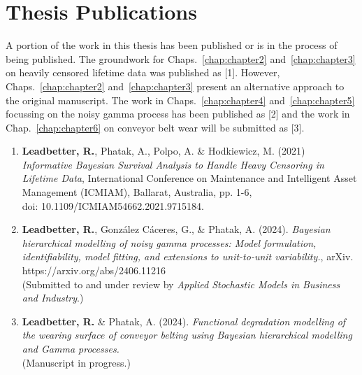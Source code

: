 
\chapter*{Thesis Publications}  \label{chap:publications}

A portion of the work in this thesis has been published or is in the process of being published. The groundwork for Chaps.~\ref{chap:chapter2} and~\ref{chap:chapter3} on heavily censored lifetime data was published as \cite{leadbetter2021}[1]. However, Chaps.~\ref{chap:chapter2} and~\ref{chap:chapter3} present an alternative approach to the original manuscript. The work in Chaps.~\ref{chap:chapter4} and~\ref{chap:chapter5} focussing on the noisy gamma process has been published as \cite{leadbetter2024}[2] and the work in Chap.~\ref{chap:chapter6} on conveyor belt wear will be submitted as \cite{leadbetter2025}[3].

\begin{enumerate}
  \item \textbf{Leadbetter, R.}, Phatak, A., Polpo, A. \& Hodkiewicz, M. (2021) \textit{Informative Bayesian Survival Analysis to Handle Heavy Censoring in Lifetime Data}, International Conference on Maintenance and Intelligent Asset Management (ICMIAM), Ballarat, Australia, pp. 1-6,\\ doi: 10.1109/ICMIAM54662.2021.9715184.
  \item \textbf{Leadbetter, R.}, Gonz\'{a}lez C\'{a}ceres, G., \& Phatak, A. (2024). \textit{Bayesian hierarchical modelling of noisy gamma processes: Model formulation, identifiability, model fitting, and extensions to unit-to-unit variability.}, arXiv.\\ https://arxiv.org/abs/2406.11216 \\
  (Submitted to and under review by \textit{Applied Stochastic Models in Business and Industry}.)
  \item \textbf{Leadbetter, R.} \& Phatak, A. (2024). \textit{Functional degradation modelling of the wearing surface of conveyor belting using Bayesian hierarchical modelling and Gamma processes.} \\
  (Manuscript in progress.)
\end{enumerate}